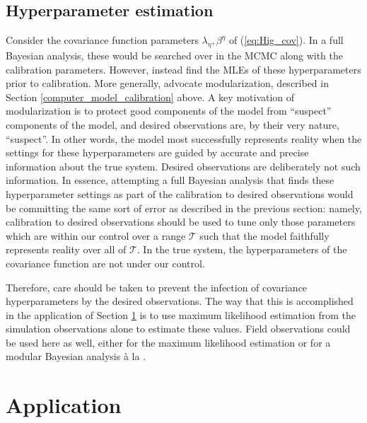 \documentclass{article}
\begin{document}
\subsection{Hyperparameter estimation}\label{hyperparameter_estimation}
Consider the covariance function parameters $\lambda_\eta,\beta^\eta$ of (\ref{eq:Hig_cov}). In a full Bayesian analysis, these would be searched over in the MCMC along with the calibration parameters. However, \cite{Kennedy2001} instead find the MLEs of these hyperparameters prior to calibration. More generally, \cite{Liu2009} advocate modularization, described in Section \ref{computer_model_calibration} above. A key motivation of modularization is to protect good components of the model from ``suspect'' components of the model, and desired observations are, by their very nature, ``suspect''. In other words, the model most successfully represents reality when the settings for these hyperparameters are guided by accurate and precise information about the true system. Desired observations are deliberately not such information. In essence, attempting a full Bayesian analysis that finds these hyperparameter settings as part of the calibration to desired observations would be committing the same sort of error as described in the previous section: namely, calibration to desired observations should be used to tune only those parameters which are within our control over a range $\mathcal T$ such that the model faithfully represents reality over all of $\mathcal T$. In the true system, the hyperparameters of the covariance function are not under our control.

Therefore, care should be taken to prevent the infection of covariance hyperparameters by the desired observations. The way that this is accomplished in the application of Section \ref{application} is to use maximum likelihood estimation from the simulation observations alone to estimate these values. Field observations could be used here as well, either for the maximum likelihood estimation or for a modular Bayesian analysis \`a la \cite{Liu2009}.

\section{Application}\label{application}
\end{document}

